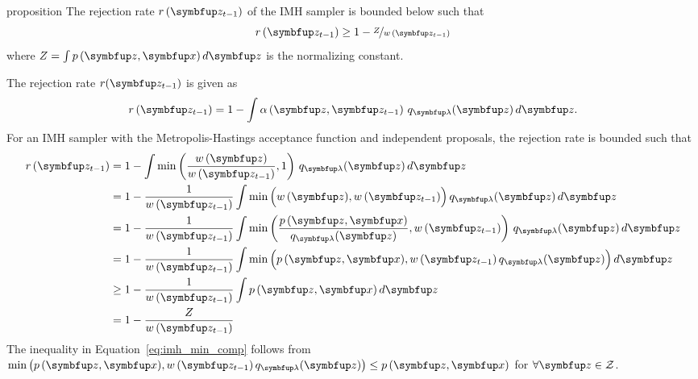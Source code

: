 
\begin{theoremEnd}[]{proposition}\label{thm:imh_bound}
  The rejection rate \(r\,(\vz_{t-1})\) of the IMH sampler is bounded below such that
  \[
  r\,(\vz_{t-1}) \geq 1 - \nicefrac{Z}{w\,(\vz_{t-1})} 
  \]
  where \(Z=\int p\,(\vz,\vx) \, d\vz\) is the normalizing constant.
\end{theoremEnd}
\begin{proofEnd}
  The rejection rate \(r(\vz_{t-1})\) is given as
  \begin{align}
    r\,(\vz_{t-1}) = 1 - \int \alpha\left(\vz, \vz_{t-1} \right) \, q_{\vlambda}(\vz) \, d\vz.
  \end{align}
  For an IMH sampler with the Metropolis-Hastings acceptance function and independent proposals, the rejection rate is bounded such that
  \begin{align}
    r\,(\vz_{t-1})
    &= 1 - \int \min\left(\frac{w\,(\vz)}{w\,(\vz_{t-1})}, 1 \right) \, q_{\vlambda}(\vz)\,d\vz \\
    &= 1 - \frac{1}{w\,(\vz_{t-1})} \int \min\Big(w\,(\vz), w\,(\vz_{t-1})\Big) \, q_{\vlambda}(\vz)\,d\vz \\
    &= 1 - \frac{1}{w\,(\vz_{t-1})} \int \min\left(\frac{p\,(\vz,\vx)}{q_{\vlambda}(\vz)}, w\,(\vz_{t-1})\right) \, q_{\vlambda}(\vz)\,d\vz \\
    &=    1 - \frac{1}{w\,(\vz_{t-1})} \int \min\Big(p\,(\vz,\vx), w\,(\vz_{t-1})\,q_{\vlambda}(\vz)\Big) \, d\vz  \\
    &\geq 1 - \frac{1}{w\,(\vz_{t-1})} \int p\,(\vz,\vx) \, d\vz \label{eq:imh_min_comp} \\
    &=    1 - \frac{Z}{w\,(\vz_{t-1})} 
  \end{align}
  The inequality in Equation~\eqref{eq:imh_min_comp} follows from \(\min\big(p\,(\vz,\vx), w\,(\vz_{t-1})\,q_{\vlambda}(\vz)\big) \leq p\,(\vz,\vx) \) for \(\forall \vz \in \mathcal{Z}\).
\end{proofEnd}

